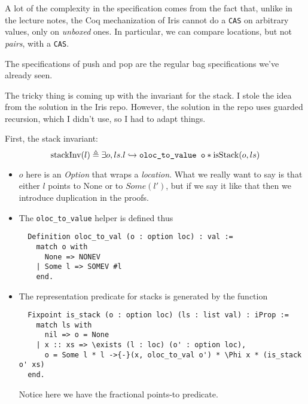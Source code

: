 A lot of the complexity in the specification comes from the fact that, unlike in the lecture notes, the Coq mechanization of Iris cannot do a \texttt{CAS} on arbitrary values, only on \emph{unboxed} ones. In particular, we can compare locations, but not \emph{pairs}, with a \texttt{CAS}. 

The specifications of push and pop are the regular bag specifications we've already seen.

The tricky thing is coming up with the invariant for the stack. I stole the idea from the solution in the Iris repo. However, the solution in the repo uses guarded recursion, which I didn't use, so I had to adapt things.

First, the stack invariant:
\[
\text{stackInv}(l) \triangleq \exists o, ls. l \hookrightarrow \texttt{oloc\_to\_value o} * \text{isStack}(o, ls)
\]

\begin{itemize}

\item $o$ here is an \emph{Option} that wraps a \emph{location}. What we really want to say is that either $l$ points to None or to $Some(l')$, but if we say it like that then we introduce duplication in the proofs. 

\item The \texttt{oloc\_to\_value} helper is defined thus

\begin{verbatim}
  Definition oloc_to_val (o : option loc) : val :=
    match o with
      None => NONEV
    | Some l => SOMEV #l
    end.
\end{verbatim}

\item The representation predicate for stacks is generated by the function

\begin{verbatim}
  Fixpoint is_stack (o : option loc) (ls : list val) : iProp :=
    match ls with
      nil => o = None
    | x :: xs => \exists (l : loc) (o' : option loc),
      o = Some l * l ->{-}(x, oloc_to_val o') * \Phi x * (is_stack o' xs)
  end.
\end{verbatim}


Notice here we have the fractional points-to predicate. 

\end{itemize}